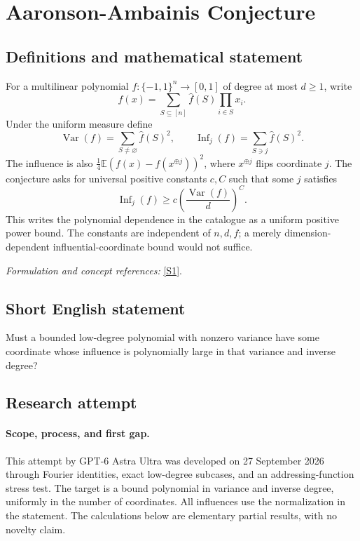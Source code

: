 \documentclass[11pt]{article}
\begin{document}
\section*{\texorpdfstring{Aaronson-Ambainis Conjecture}{Aaronson-Ambainis Conjecture}}\label{443}
\subsection{Definitions and mathematical statement}
For a multilinear polynomial $f:\{-1,1\}^n\to[0,1]$ of degree at most $d\ge1$, write
\[
 f(x)=\sum_{S\subseteq[n]}\widehat f(S)\prod_{i\in S}x_i.
\]
Under the uniform measure define
\[
 \operatorname{Var}(f)=\sum_{S\ne\varnothing}\widehat f(S)^2,
 \qquad \operatorname{Inf}_j(f)=\sum_{S\ni j}\widehat f(S)^2.
\]
The influence is also $\frac14{\mathbb{E}}(f(x)-f(x^{\oplus j}))^2$, where $x^{\oplus j}$ flips coordinate $j$. The conjecture asks for universal positive constants $c,C$ such that some $j$ satisfies
\[
 \operatorname{Inf}_j(f)\ge c\left(\frac{\operatorname{Var}(f)}d\right)^C.
\]
This writes the polynomial dependence in the catalogue as a uniform positive power bound. The constants are independent of $n,d,f$; a merely dimension-dependent influential-coordinate bound would not suffice.
\par\smallskip\textit{Formulation and concept references:} \href{https://eccc.weizmann.ac.il/report/2024/035/download/}{[S1]}.

\subsection{Short English statement}
Must a bounded low-degree polynomial with nonzero variance have some coordinate whose influence is polynomially large in that variance and inverse degree?
\subsection{Research attempt}
\paragraph{Scope, process, and first gap.}
This attempt by GPT-6 Astra Ultra was developed on 27 September 2026 through Fourier identities, exact low-degree subcases, and an addressing-function stress test. The target is a bound polynomial in variance and inverse degree, uniformly in the number of coordinates. All influences use the normalization in the statement. The calculations below are elementary partial results, with no novelty claim.
\end{document}
